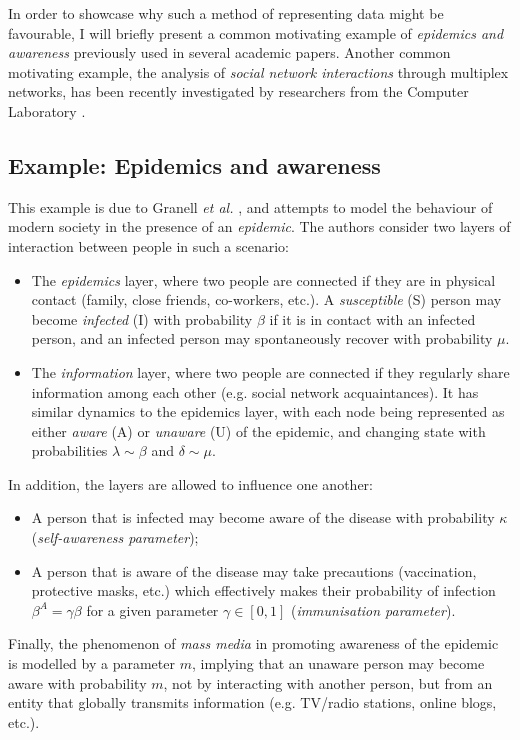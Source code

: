 \documentclass[12pt,a4paper,twoside,openright]{report}
\begin{document}
In order to showcase why such a method of representing data might be favourable, I will briefly present a common motivating example of \emph{epidemics and awareness} previously used in several academic papers. Another common motivating example, the analysis of \emph{social network interactions} through multiplex networks, has been recently investigated by researchers from the Computer Laboratory \cite{DBLP:journals/corr/HristovaMM14}.

\subsection{Example: Epidemics and awareness}

This example is due to Granell \emph{et al.} \cite{granell2014competing}, and attempts to model the behaviour of modern society in the presence of an \emph{epidemic}. The authors consider two layers of interaction between people in such a scenario:
\begin{itemize}
	\item The \emph{epidemics} layer, where two people are connected if they are in physical contact (family, close friends, co-workers, etc.). A \emph{susceptible} (S) person may become \emph{infected} (I) with probability $\beta$ if it is in contact with an infected person, and an infected person may spontaneously recover with probability $\mu$.
	\item The \emph{information} layer, where two people are connected if they regularly share information among each other (e.g. social network acquaintances). It has similar dynamics to the epidemics layer, with each node being represented as either \emph{aware} (A) or \emph{unaware} (U) of the epidemic, and changing state with probabilities $\lambda\sim\beta$ and $\delta\sim\mu$. 
\end{itemize}
In addition, the layers are allowed to influence one another:
\begin{itemize}
	\item A person that is infected may become aware of the disease with probability $\kappa$ (\emph{self-awareness parameter});
	\item A person that is aware of the disease may take precautions (vaccination, protective masks, etc.) which effectively makes their probability of infection $\beta^{A} = \gamma\beta$ for a given parameter $\gamma \in [0, 1]$ (\emph{immunisation parameter}).
\end{itemize}
Finally, the phenomenon of \emph{mass media} in promoting awareness of the epidemic is modelled by a parameter $m$, implying that an unaware person may become aware with probability $m$, not by interacting with another person, but from an entity that globally transmits information (e.g. TV/radio stations, online blogs, etc.).\\ \\
\end{document}
